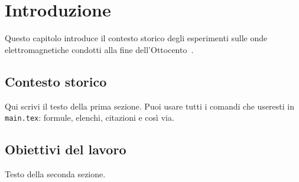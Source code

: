 \chapter*{Introduzione}

Questo capitolo introduce il contesto storico degli esperimenti sulle
onde elettromagnetiche condotti alla fine dell'Ottocento~\cite{righi1897ottica}.

\section{Contesto storico}

Qui scrivi il testo della prima sezione. Puoi usare tutti i comandi
che useresti in \texttt{main.tex}: formule, elenchi, citazioni e così via.

\section{Obiettivi del lavoro}

Testo della seconda sezione.

